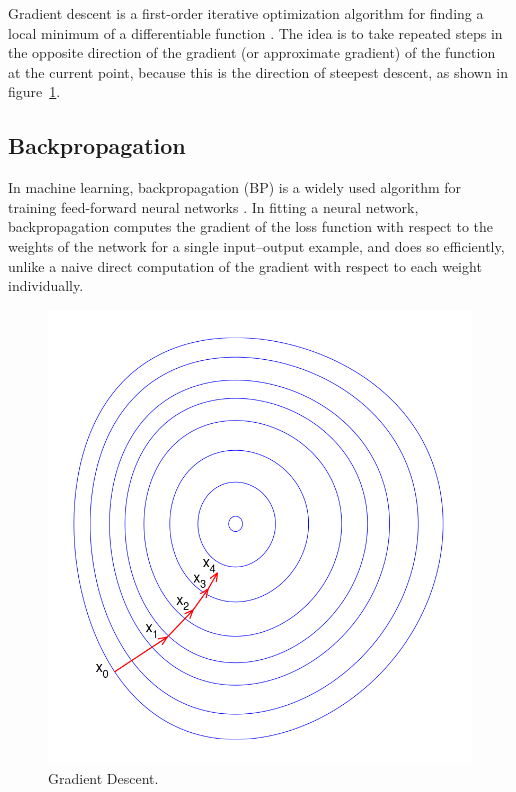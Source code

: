 \documentclass[twoside,twocolumn]{article}
\begin{document}
Gradient descent is a first-order iterative optimization algorithm for finding a local minimum of a differentiable function \cite{gradient}. The idea is to take repeated steps in the opposite direction of the gradient (or approximate gradient) of the function at the current point, because this is the direction of steepest descent, as shown in figure~\ref{fig:grad}.

\subsection{Backpropagation}

In machine learning, backpropagation (BP) is a widely used algorithm for training feed-forward neural networks \cite{lecun1988theoretical}. In fitting a neural network, backpropagation computes the gradient of the loss function with respect to the weights of the network for a single input–output example, and does so efficiently, unlike a naive direct computation of the gradient with respect to each weight individually.

\begin{figure}[h]
	\centering
	\includegraphics[width=1.0\columnwidth, clip=true]{fig/Gradient_descent.png}
	\vspace{-4mm}
	\caption{Gradient Descent.}
	\label{fig:grad}
	\vspace{-5mm}
\end{figure}
\end{document}
